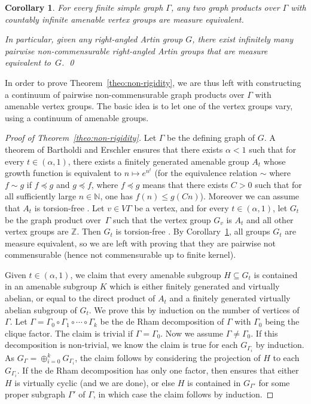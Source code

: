 \documentclass[JEP,XML,SOM,Unicode,NoFloatCountersInSection,published]{cedram}
\theoremstyle{plain}
\newtheorem{cor}[theo]{Corollary}
\theoremstyle{definition}
\begin{document}
\begin{cor}\label{cor:flexibility}
For every finite simple graph $\Gamma$, any two graph products over $\Gamma$ with countably infinite amenable vertex groups are measure equivalent.

In particular, given any right-angled Artin group $G$, there exist infinitely many pairwise non-commensurable right-angled Artin groups that are measure equivalent to~$G$.
\qed
\end{cor}

In order to prove Theorem~\ref{theo:non-rigidity}, we are thus left with constructing a continuum of pairwise non-commensurable graph products over $\Gamma$ with amenable vertex groups. The basic idea is to let one of the vertex groups vary, using a continuum of amenable groups.

\begin{proof}[Proof of Theorem~\ref{theo:non-rigidity}]
Let $\Gamma$ be the defining graph of $G$. A theorem of Bartholdi and Erschler \cite{BE} ensures that there exists $\alpha<1$ such that for every $t\in (\alpha,1)$, there exists a finitely generated amenable group $A_t$ whose growth function is equivalent to $n\mapsto e^{n^{t}}$ (for the equivalence relation $\sim$ where $f\sim g$ if $f\preceq g$ and $g\preceq f$, where $f\preceq g$ means that there exists $C>0$ such that for all sufficiently large $n\in\mathbb{N}$, one has $f(n)\le g(Cn)$). Moreover we can assume that $A_t$ is torsion-free \cite[Rem.\,1.1]{BE}. Let $v\in V\Gamma$ be a vertex, and for every $t\in (\alpha,1)$, let $G_t$ be the graph product over~$\Gamma$ such that the vertex group $G_v$ is $A_t$ and all other vertex groups are $\mathbb Z$. Then $G_t$ is torsion-free \cite[Cor.\,5.9]{antolin2015tits}. By Corollary~\ref{cor:flexibility}, all groups $G_t$ are measure equivalent, so we are left with proving that they are pairwise not commensurable (hence not commensurable up to finite kernel).

Given $t\in (\alpha,1)$, we claim that every amenable subgroup $H\subseteq G_t$ is contained in an amenable subgroup $K$ which is either finitely generated and virtually abelian, or equal to the direct product of $A_t$ and a finitely generated virtually abelian subgroup of $G_t$. We prove this by induction on the number of vertices of $\Gamma$. Let $\Gamma=\Gamma_0\circ \Gamma_1\circ\cdots\circ\Gamma_k$ be the de Rham decomposition of $\Gamma$ with $\Gamma_0$ being the clique factor. The claim is trivial if $\Gamma=\Gamma_0$. Now we assume $\Gamma\neq\Gamma_0$. If this decomposition is non-trivial, we know the claim is true for each $G_{\Gamma_i}$ by induction. As $G_{\Gamma}=\oplus_{i=0}^kG_{\Gamma_i}$, the claim follows by considering the projection of $H$ to each $G_{\Gamma_i}$. If the de Rham decomposition has only one factor, then \cite[Th.\,4.1]{antolin2015tits} ensures that either $H$ is virtually cyclic (and we are done), or else $H$ is contained in $G_{\Gamma'}$ for some proper subgraph $\Gamma'$ of $\Gamma$, in which case the claim follows by induction.


\end{proof}
\end{document}

